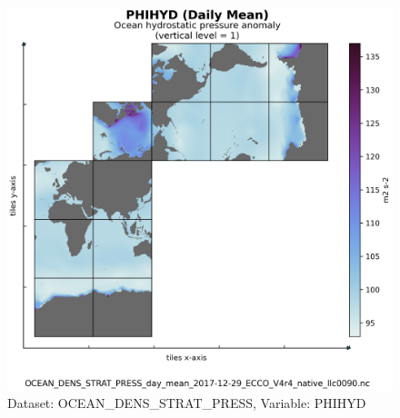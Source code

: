 \begin{figure}[H]
\centering
\includegraphics[scale=0.55]{../images/plots/native_plots/Ocean_Density_Stratification_and_Hydrostatic_Pressure/PHIHYD.png}
\caption{Dataset: OCEAN\_DENS\_STRAT\_PRESS, Variable: PHIHYD}
\label{tab:table-OCEAN_DENS_STRAT_PRESS_PHIHYD-Plot}
\end{figure}
\newpage
\pagebreak
